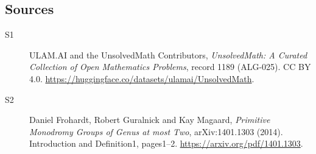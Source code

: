 \documentclass[11pt]{book}
\begin{document}
\subsection{Sources}
\begin{description}
\item[\hypertarget{source:1189:1}{S1}] ULAM.AI and the UnsolvedMath Contributors, \emph{UnsolvedMath: A Curated Collection of Open Mathematics Problems}, record 1189 (ALG-025). CC BY 4.0. \url{https://huggingface.co/datasets/ulamai/UnsolvedMath}.
\item[\hypertarget{source:1189:2}{S2}] Daniel Frohardt, Robert Guralnick and Kay Magaard, \emph{Primitive Monodromy Groups of Genus at most Two}, arXiv:1401.1303 (2014). Introduction and Definition1, pages1--2. \url{https://arxiv.org/pdf/1401.1303}.
\end{description}
\label{end:1189}
\end{document}
